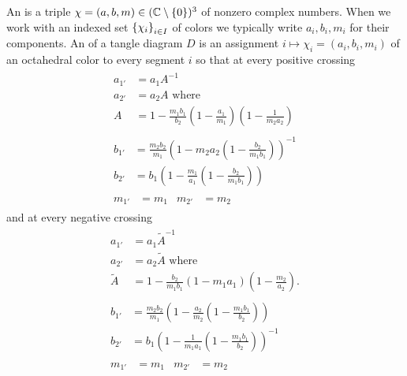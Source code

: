\documentclass[leqno]{sl2art}
\begin{document}
\begin{definition}
  \label{def:octahedral-stuff}
  An  is a triple \(\chi = (a, b, m) \in (\mathbb{C} \setminus \set{0} )^3\) of nonzero complex numbers.
  When we work with an indexed set \(\set{\chi_{i}}_{i \in I}\) of colors we typically write \(a_i, b_i, m_i\) for their components.
  An  of a tangle diagram \(D\) is an assignment \(i \mapsto \chi_i = (a_i, b_i, m_i)\) of an octahedral color to every segment \(i\) so that at every positive crossing
  \begin{gather}
    \label{eq:a-transf-positive}
    \begin{aligned}
      a_{1'}
      &=
      a_1 A^{-1}
      \\
      a_{2'}
      &=
      a_2 A \text{ where}
      \\
      A &= 1 - \frac{m_1 b_1}{b_2} \left(1 - \frac{a_1}{m_1}\right)\left(1 - \frac{1}{m_2 a_2}\right)
    \end{aligned}
    \\
    \label{eq:b-transf-positive}
    \begin{aligned}
      b_{1'}
      &=
      \frac{m_2 b_2}{m_1}
      \left(
        1 - m_2 a_2 \left( 1 - \frac{b_2}{m_1 b_1} \right)
      \right)^{-1}
      \\
      b_{2'}
      &=
      b_1
      \left(
        1 - \frac{m_1}{a_1}\left( 1 - \frac{b_2}{m_1 b_1} \right)
      \right)
    \end{aligned}
    \\
    \label{eq:m-transf-positive}
    \begin{aligned}
      m_{1'}
      &= m_1
      &
      m_{2'}
      &= m_2
    \end{aligned}
  \end{gather}
  and at every negative crossing
  \begin{gather}
    \label{eq:a-transf-negative}
    \begin{aligned}
      a_{1'}
      &=
      a_1 \tilde A^{-1} 
      \\
      a_{2'}
      &=
      a_2 \tilde A \text{ where}
      \\
      \tilde A 
      &=
      1 - \frac{b_2}{m_1 b_1}\left(1 - m_1 a_1 \right)\left(1 - \frac{m_2}{a_2}\right).
    \end{aligned}
    \\
    \label{eq:b-transf-negative}
    \begin{aligned}
      b_{1'}
      &=
      \frac{m_2 b_2}{m_1}
      \left(
        1 - \frac{a_2}{m_2} \left( 1 - \frac{m_1 b_1}{b_2} \right)
      \right)
      \\
      b_{2'}
      &=
      b_1
      \left(
        1 - \frac{1}{m_1 a_1} \left( 1 - \frac{m_1 b_1}{b_2} \right)
      \right)^{-1}
    \end{aligned}
    \\
    \label{eq:m-transf-negative}
    \begin{aligned}
      m_{1'}
      &= m_1
      &
      m_{2'}
      &= m_2
    \end{aligned}
  \end{gather}
\end{definition}
\end{document}
